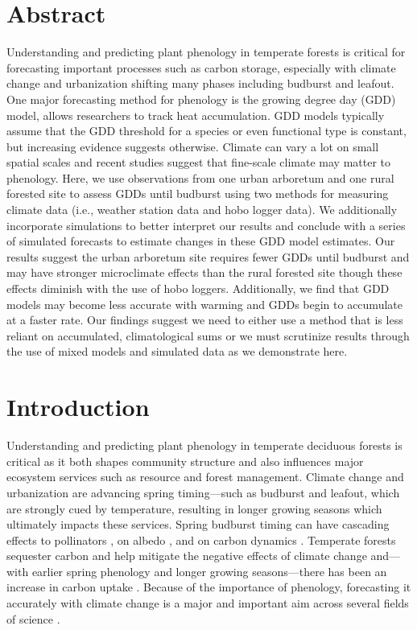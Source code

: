 \documentclass{article}\usepackage[]{graphicx}\usepackage[]{color}
\begin{document}
\section*{Abstract} %
Understanding and predicting plant phenology in temperate forests is critical for forecasting important processes such as carbon storage, especially with climate change and urbanization shifting many phases including budburst and leafout. One major forecasting method for phenology is the growing degree day (GDD) model, allows researchers to track heat accumulation. GDD models typically assume that the GDD threshold for a species or even functional type is constant, but increasing evidence suggests otherwise. Climate can vary a lot on small spatial scales and recent studies suggest that fine-scale climate may matter to phenology. Here, we use observations from one urban arboretum and one rural forested site to assess GDDs until budburst using two methods for measuring climate data (i.e., weather station data and hobo logger data). We additionally incorporate simulations to better interpret our results and conclude with a series of simulated forecasts to estimate changes in these GDD model estimates. Our results suggest the urban arboretum site requires fewer GDDs until budburst and may have stronger microclimate effects than the rural forested site though these effects diminish with the use of hobo loggers. Additionally, we find that GDD models may become less accurate with warming and GDDs begin to accumulate at a faster rate. Our findings suggest we need to either use a method that is less reliant on accumulated, climatological sums or we must scrutinize results through the use of mixed models and simulated data as we demonstrate here.

\section*{Introduction}

Understanding and predicting plant phenology in temperate deciduous forests is critical as it both shapes community structure and also influences major ecosystem services such as resource and forest management. Climate change and urbanization are advancing spring timing---such as budburst and leafout, which  are strongly cued by temperature, resulting in longer growing seasons \citep{Chuine2001} which ultimately impacts these services. Spring budburst timing can have cascading effects to pollinators \citep{Boggs2012, Pardee2017}, on albedo \citep{Williamson2016}, and on carbon dynamics \citep{Richardson2013}. Temperate forests sequester carbon and help mitigate the negative effects of climate change and---with earlier spring phenology and longer growing seasons---there has been an increase in carbon uptake \citep{Keenan2014}. Because of the importance of phenology, forecasting it accurately with climate change is a major and important aim across several fields of science \citep{Moorcroft2001,Taylor2020,Yu2016,Zhao2012}.
  
\end{document}
